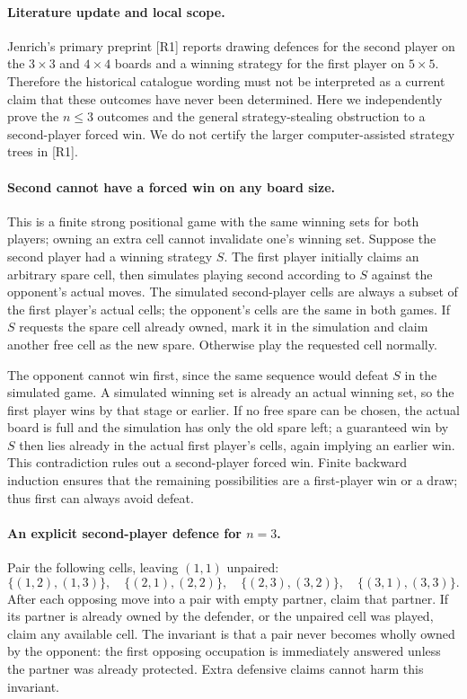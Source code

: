 \documentclass[11pt,a4paper]{article}
\begin{document}
\paragraph{Literature update and local scope.}
Jenrich's primary preprint [R1] reports drawing defences for the
second player on the $3\times3$ and $4\times4$ boards and a
winning strategy for the first player on $5\times5$. Therefore
the historical catalogue wording must not be interpreted as a
current claim that these outcomes have never been determined.
Here we independently prove the $n\le3$ outcomes and the general
strategy-stealing obstruction to a second-player forced win. We
do not certify the larger computer-assisted strategy trees in [R1].

\paragraph{Second cannot have a forced win on any board size.}
This is a finite strong positional game with the same winning sets
for both players; owning an extra cell cannot invalidate one's
winning set. Suppose the second player had a winning strategy $S$.
The first player initially claims an arbitrary spare cell, then
simulates playing second according to $S$ against the opponent's
actual moves. The simulated second-player cells are always a subset
of the first player's actual cells; the opponent's cells are the
same in both games. If $S$ requests the spare cell already owned,
mark it in the simulation and claim another free cell as the new
spare. Otherwise play the requested cell normally.

The opponent cannot win first, since the same sequence would defeat
$S$ in the simulated game. A simulated winning set is already an
actual winning set, so the first player wins by that stage or earlier.
If no free spare can be chosen, the actual board is full and the
simulation has only the old spare left; a guaranteed win by $S$
then lies already in the actual first player's cells, again implying
an earlier win. This contradiction rules out a second-player forced
win. Finite backward induction ensures that the remaining possibilities
are a first-player win or a draw; thus first can always avoid defeat.

\paragraph{An explicit second-player defence for $n=3$.}
Pair the following cells, leaving $(1,1)$ unpaired:
\[
 \{(1,2),(1,3)\},\quad
 \{(2,1),(2,2)\},\quad
 \{(2,3),(3,2)\},\quad
 \{(3,1),(3,3)\}.
\]
After each opposing move into a pair with empty partner, claim
that partner. If its partner is already owned by the defender,
or the unpaired cell was played, claim any available cell.
The invariant is that a pair never becomes wholly owned by the
opponent: the first opposing occupation is immediately answered
unless the partner was already protected. Extra defensive claims
cannot harm this invariant.
\end{document}
